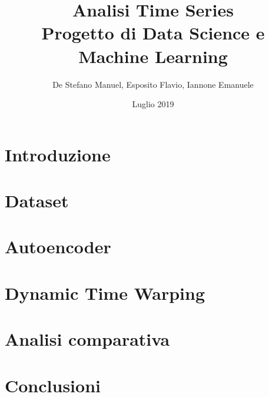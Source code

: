 \documentclass[12pt]{report}
\title{
	Analisi Time Series\\
	\large Progetto di Data Science e Machine Learning
}
\author{De Stefano Manuel, Esposito Flavio, Iannone Emanuele}
\date{Luglio 2019}
\begin{document}
\maketitle
\tableofcontents

\chapter{Introduzione} \label{chap:intro}


\chapter{Dataset} \label{chap:dataset}


\chapter{Autoencoder} \label{chap:autoencoder}


\chapter{Dynamic Time Warping} \label{chap:dtw}


\chapter{Analisi comparativa} \label{chap:comparison}


\chapter{Conclusioni} \label{chap:conclusioni}


\printbibliography
\end{document}
